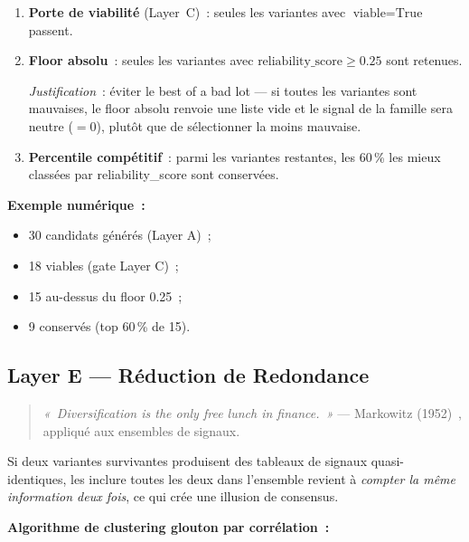 \begin{enumerate}
    \item \textbf{Porte de viabilité} (Layer~C)~: seules les variantes avec
    $\text{viable} = \text{True}$ passent.

    \item \textbf{Floor absolu}~: seules les variantes avec
    $\text{reliability\_score} \geq 0.25$ sont retenues.

    \textit{Justification}~: éviter le \og best of a bad lot \fg{} — si toutes les
    variantes sont mauvaises, le floor absolu renvoie une liste vide et le signal de
    la famille sera neutre ($= 0$), plutôt que de sélectionner la moins mauvaise.

    \item \textbf{Percentile compétitif}~: parmi les variantes restantes, les 60\,\%
    les mieux classées par reliability\_score sont conservées.
\end{enumerate}

\textbf{Exemple numérique~:}
\begin{itemize}
    \item 30 candidats générés (Layer A)~;
    \item 18 viables (gate Layer C)~;
    \item 15 au-dessus du floor 0.25~;
    \item 9 conservés (top 60\,\% de 15).
\end{itemize}

\subsection{Layer E — Réduction de Redondance}

\begin{quote}
\textit{«~Diversification is the only free lunch in finance.~»}
— Markowitz (1952)~\cite{markowitz1952}, appliqué aux ensembles de signaux.
\end{quote}

Si deux variantes survivantes produisent des tableaux de signaux quasi-identiques,
les inclure toutes les deux dans l'ensemble revient à \emph{compter la même information
deux fois}, ce qui crée une illusion de consensus.

\textbf{Algorithme de clustering glouton par corrélation~:}

